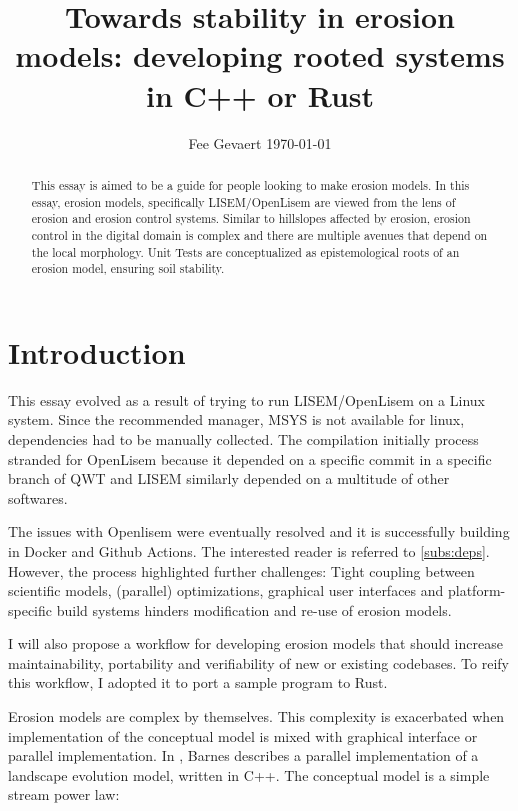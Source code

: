 \documentclass[a4paper]{article} %
\title{Towards stability in erosion models: developing rooted systems in C++ or Rust}
\author{Fee Gevaert \orcidlink{https://orcid.org/0009-0008-2311-6336} \today{}}
\begin{document}
\begin{abstract}
    This essay is aimed to be a guide for people looking to make erosion models.
    In this essay, erosion models, specifically LISEM/OpenLisem are viewed from
    the lens of erosion and erosion control systems. Similar to hillslopes
    affected by erosion, erosion control in the digital domain is complex and
    there are multiple avenues that depend on the local morphology. Unit Tests
    are conceptualized as epistemological roots of an erosion model, ensuring
    soil stability. 
\end{abstract}

\linenumbers

\maketitle

\tableofcontents

\section{Introduction}

This essay evolved as a result of trying to run LISEM/OpenLisem on a Linux
system.  Since the recommended manager, MSYS is not available for linux,
dependencies had to be manually collected. The compilation initially process stranded for
OpenLisem because it depended on a specific commit in a specific branch of QWT
and LISEM similarly depended on a multitude of other softwares.

The issues with Openlisem were eventually resolved and it is successfully
building in Docker and Github Actions. The interested reader is referred to \ref{subs:deps}. However, the process highlighted further
challenges: Tight coupling between scientific models, (parallel) optimizations,
graphical user interfaces and platform-specific build systems hinders
modification and re-use of erosion models.

I will also propose a workflow for developing erosion
models that should increase maintainability, portability and verifiability of
new or existing codebases. To reify this workflow, I adopted it to port a sample
program \cite{barnesAcceleratingFluvialIncision2019} to Rust.

Erosion models are complex by themselves. This complexity is exacerbated when
implementation of the conceptual model is mixed with graphical interface or
parallel implementation. In \cite{barnesAcceleratingFluvialIncision2019}, Barnes
describes a parallel implementation of a landscape evolution model, written in
C++. The conceptual model is a simple stream power law:
\end{document}
